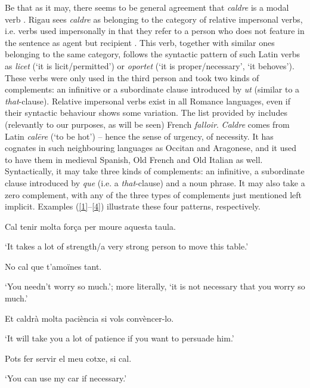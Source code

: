 \documentclass[output=paper,english,spanish,german,english]{langsci/langscibook}
\begin{document}
Be that as it may, there seems to be general agreement that \textit{caldre} is a modal verb \parencites[see e.g.][1192]{payrato02}{rigau05}. Rigau sees \textit{caldre} as belonging to the category of relative impersonal verbs, i.e. verbs used impersonally in that they refer to a person who does not feature in the sentence as agent but recipient \parencite[242]{rigau05}. This verb, together with similar ones belonging to the same category, follows the syntactic pattern of such Latin verbs as \textit{licet} (`it is licit\slash permitted') or \textit{oportet} (`it is proper\slash necessary', `it behoves'). These verbs were only used in the third person and took two kinds of complements: an infinitive or a subordinate clause introduced by \textit{ut} (similar to a \textit{that}-clause). Relative impersonal verbs exist in all Romance languages, even if their syntactic behaviour shows some variation. The list provided by \citet[324]{rigau99} includes (relevantly to our purposes, as will be seen) French \textit{falloir}. \textit{Caldre} comes from Latin \textit{calēre} (`to be hot') -- hence the sense of urgency, of necessity. It has cognates in such neighbouring languages as Occitan and Aragonese, and it used to have them in medieval Spanish, Old French and Old Italian \parencite[331]{rigau99} as well. Syntactically, it may take three kinds of complements: an infinitive, a subordinate clause introduced by \textit{que} (i.e. a \textit{that}-clause) and a noun phrase. It may also take a zero complement, with any of the three types of complements just mentioned left implicit. Examples (\ref{1}--\ref{4}) illustrate these four patterns, respectively.

\begin{exe}
  \ex Cal tenir molta força per moure aquesta taula.\label{1}

  `It takes a lot of strength\slash a very strong person to move this table.'

  \ex No cal que t’amoïnes tant.\label{2}

  `You needn’t worry so much.'; more literally, `it is not necessary that you worry so much.'

  \ex Et caldrà molta paciència si vols convèncer-lo.\label{3}

  `It will take you a lot of patience if you want to persuade him.'

  \ex Pots fer servir el meu cotxe, si cal.\label{4}

  `You can use my car if necessary.'
\end{exe}
\end{document}
